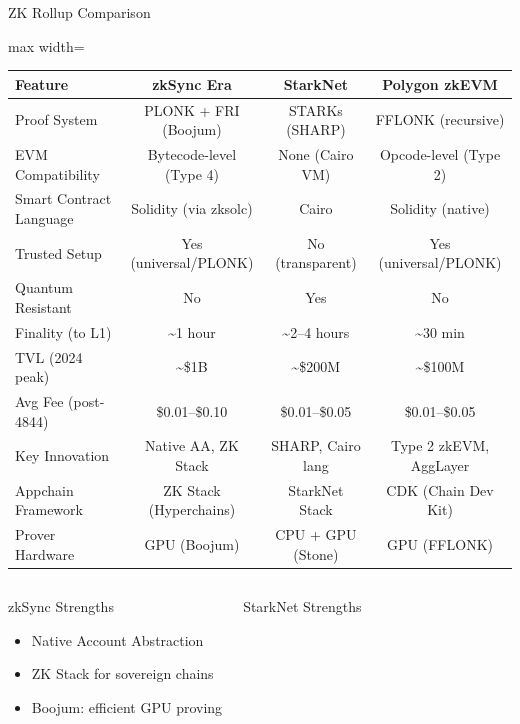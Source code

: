 \documentclass[8pt,aspectratio=169]{beamer}
\begin{document}
\begin{frame}{ZK Rollup Comparison}
\vspace{-1mm}
\begin{adjustbox}{max width=\textwidth}
\begin{tabular}{l >{\small}c >{\small}c >{\small}c}
\toprule
\textbf{Feature} & \textbf{zkSync Era} & \textbf{StarkNet} & \textbf{Polygon zkEVM} \\
\midrule
Proof System & PLONK + FRI (Boojum) & STARKs (SHARP) & FFLONK (recursive) \\
EVM Compatibility & Bytecode-level (Type 4) & None (Cairo VM) & Opcode-level (Type 2) \\
Smart Contract Language & Solidity (via zksolc) & Cairo & Solidity (native) \\
Trusted Setup & Yes (universal/PLONK) & No (transparent) & Yes (universal/PLONK) \\
Quantum Resistant & No & Yes & No \\
Finality (to L1) & \textasciitilde1 hour & \textasciitilde2--4 hours & \textasciitilde30 min \\
TVL (2024 peak) & \textasciitilde\$1B & \textasciitilde\$200M & \textasciitilde\$100M \\
Avg Fee (post-4844) & \$0.01--\$0.10 & \$0.01--\$0.05 & \$0.01--\$0.05 \\
Key Innovation & Native AA, ZK Stack & SHARP, Cairo lang & Type 2 zkEVM, AggLayer \\
Appchain Framework & ZK Stack (Hyperchains) & StarkNet Stack & CDK (Chain Dev Kit) \\
Prover Hardware & GPU (Boojum) & CPU + GPU (Stone) & GPU (FFLONK) \\
\bottomrule
\end{tabular}
\end{adjustbox}
\vspace{4mm}
\begin{columns}[T]
\begin{block}{\footnotesize zkSync Strengths}
\scriptsize
\begin{itemize}
  \item Native Account Abstraction
  \item ZK Stack for sovereign chains
  \item Boojum: efficient GPU proving
\end{itemize}
\end{block}
\begin{block}{\footnotesize StarkNet Strengths}

\end{block}
\end{columns}
\end{frame}
\end{document}
